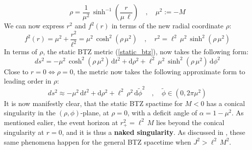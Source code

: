 %
%
\begin{equation}
\rho = \frac{1}{\mu^2} \, \sinh^{-1} \left( \frac{r}{\mu \, \ell} \right)
\quad , \quad
\mu^2 := -M
\end{equation}
%
%
We can now express $r^2$ and $f^2(r)$ in terms of the new radial coordinate $\rho$:
%
%
\begin{equation}
f^2(r) = \mu^2 + \frac{r^2}{\ell^2}
= \mu^2 \, \cosh^2(\rho \, \mu^2)
\quad , \quad
r^2 = \ell^2 \, \mu^2 \, \sinh^2(\rho \, \mu^2)
\end{equation}
%
%
In terms of $\rho$, the static BTZ metric (\ref{static_btz}), now takes the following form:
%
%
\begin{equation}
ds^2 = -\mu^2 \, \cosh^2(\rho \, \mu^2) \, \mathrm{d}t^2
+ \mathrm{d}\rho^2
+ \ell^2 \, \mu^2 \, \sinh^2(\rho \, \mu^2) \, \mathrm{d}\phi^2
\end{equation}
%
%
Close to $r=0 \Leftrightarrow \rho = 0$, the metric now takes the following approximate form to leading order in $\rho$:
%
%
\begin{equation}
ds^2 \approx -\mu^2 \, \mathrm{d}t^2
+ \mathrm{d}\rho^2
+ \ell^2 \, \rho^2 \, \mathrm{d}\tilde{\phi}^2
\quad , \quad
\tilde{\phi} \in (0, 2 \pi \mu^2)
\end{equation}
%
%
It is now manifestly clear, that the static BTZ spactime for $M < 0$ has a conical singularity in the $(\rho, \phi)$-plane, at $\rho = 0$, with a deficit angle of $\alpha = 1-\mu^2$. As mentioned ealier, the event horizon at $r^2_+ = \ell^2 \, M$ lies beyond the conical singularity at $r=0$, and it is thus a \textbf{naked singularity}. As discussed in \cite{2+1 black hole}, these same phenomena happen for the general BTZ spacetime when $J^2 > \ell^2 \, M^2$.
